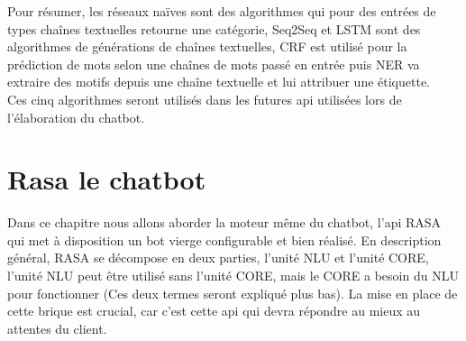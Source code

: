 \pagebreak

Pour résumer, les réseaux naïves sont des algorithmes qui pour des entrées de types chaînes textuelles retourne une catégorie, Seq2Seq et LSTM sont des algorithmes de générations de chaînes textuelles, CRF est utilisé pour la prédiction de mots selon une chaînes de mots passé en entrée puis NER va extraire des motifs depuis une chaîne textuelle et lui attribuer une étiquette.\\
\linebreak
Ces cinq algorithmes seront utilisés dans les futures api utilisées lors de l'élaboration du chatbot.\\
\pagebreak

\chapter{Rasa le chatbot}

Dans ce chapitre nous allons aborder la moteur même du chatbot, l'api RASA qui met à disposition un bot vierge configurable et bien réalisé. \linebreak
En description général, RASA se décompose en deux parties, l'unité NLU et l'unité CORE, l'unité NLU peut être utilisé sans l'unité CORE, mais le CORE a besoin du NLU pour fonctionner (Ces deux termes seront expliqué plus bas).
La mise en place de cette brique est crucial, car c'est cette api qui devra répondre au mieux au attentes du client.

\pagebreak

